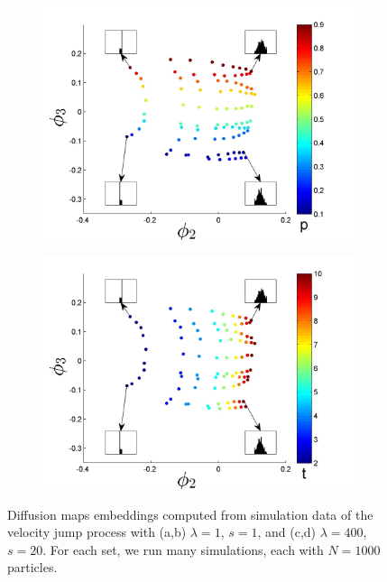 \documentclass[preprint]{elsarticle}
\begin{document}
\begin{figure}[t!]
\begin{subfigure}{5cm}
\caption{}
\label{subfig:small_lambda_t}
\end{subfigure}
\begin{subfigure}{5cm}
\includegraphics[width=\textwidth]{EMD_withhist_p_400}
\caption{}
\label{subfig:large_lambda_p}
\end{subfigure}
\begin{subfigure}{5cm}
\includegraphics[width=\textwidth]{EMD_withhist_t_400}
\caption{}
\label{subfig:large_lambda_t}
\end{subfigure}
\caption{Diffusion maps embeddings computed from simulation data of the velocity jump process with (a,b) $\lambda=1$, $s=1$, and (c,d) $\lambda=400$, $s=20$.  For each set, we run many simulations, each with $N=1000$ particles.
}
\end{figure}
\end{document}
